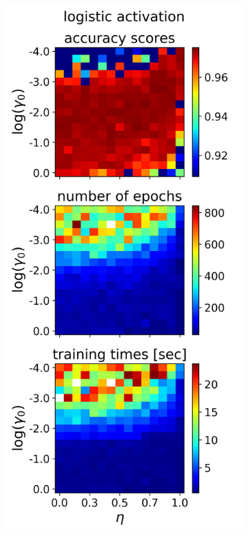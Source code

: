 \documentclass[nofootinbib,reprint,english]{revtex4-1}
\begin{document}
\begin{figure}[h!]
\centering
	\begin{subfigure}{0.32\textwidth}
	\centering
	\includegraphics[scale=0.38]{../results/NN/img/gridsearch2_logistic1.png}

\end{subfigure}
\end{figure}
\end{document}
